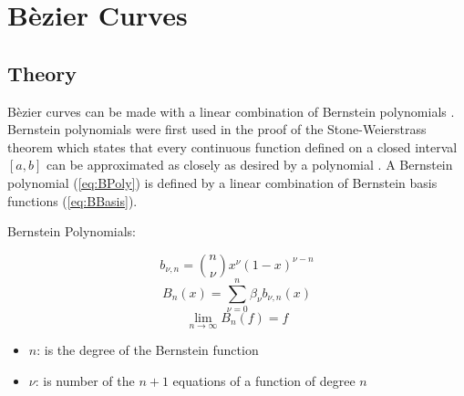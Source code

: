 \documentclass[12pt, letterpaper]{article}
\begin{document}
\section{B\`ezier Curves}
\subsection{Theory}
B\`ezier curves can be made with a linear combination of Bernstein polynomials \citep{ams}. Bernstein
polynomials were first used in the proof of the Stone-Weierstrass theorem which states that every continuous
function defined on a closed interval $[a,b]$ can be approximated as closely as desired by a polynomial
\citep{weierstrass}. A Bernstein polynomial (\ref{eq:BPoly}) is defined by a linear combination of Bernstein
basis functions (\ref{eq:BBasis}).

Bernstein Polynomials:
\begin{singlespace}
  \begin{equation}
    \label{eq:BBasis}
    b_{\nu,n} = {n \choose \nu} x^\nu (1 - x)^{\nu - n}
  \end{equation}
  \begin{equation}
    \label{eq:BPoly}
    B_n(x) = \sum_{\nu = 0}^{n}\beta_\nu b_{\nu,n} (x)
  \end{equation}
  \begin{equation}
    \label{eq:BLimit}
    \lim_{n\to\infty} B_n(f) = f
  \end{equation}
  \begin{small}
		\begin{itemize}[label=]
    	\item $n$: is the degree of the Bernstein function
    	\item $\nu$: is number of the $n+1$ equations of a function of degree $n$ 
		\end{itemize}
  \end{small}
\end{singlespace}
\end{document}
